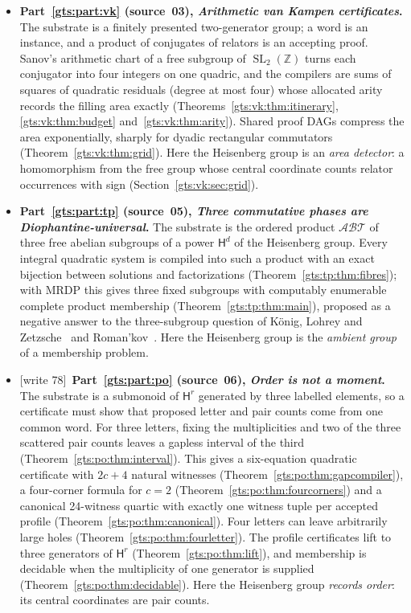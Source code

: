 \documentclass[11pt,letterpaper]{article}
\theoremstyle{definition}
\theoremstyle{remark}
\newcommand{\Z}{\mathbb Z}
\newcommand{\SL}{\operatorname{SL}}
\newcommand{\HH}{\mathsf H}
\newcommand{\calA}{\mathcal A}
\newcommand{\calB}{\mathcal B}
\newcommand{\calT}{\mathcal T}
\newcommand{\wtagb}{\textup{[write 78]}}
\begin{document}
\begin{itemize}
\item \textbf{Part~\ref{gts:part:vk} (source~03), \emph{Arithmetic van Kampen certificates}.} The substrate is a finitely presented two-generator group; a word is an instance, and a product of conjugates of relators is an accepting proof. Sanov's arithmetic chart of a free subgroup of $\SL_2(\Z)$ turns each conjugator into four integers on one quadric, and the compilers are sums of squares of quadratic residuals (degree at most four) whose allocated arity records the filling area exactly (Theorems~\ref{gts:vk:thm:itinerary}, \ref{gts:vk:thm:budget} and~\ref{gts:vk:thm:arity}). Shared proof DAGs compress the area exponentially, sharply for dyadic rectangular commutators (Theorem~\ref{gts:vk:thm:grid}). Here the Heisenberg group is an \emph{area detector}: a homomorphism from the free group whose central coordinate counts relator occurrences with sign (Section~\ref{gts:vk:sec:grid}).
\item \textbf{Part~\ref{gts:part:tp} (source~05), \emph{Three commutative phases are Diophantine-universal}.} The substrate is the ordered product $\calA\calB\calT$ of three free abelian subgroups of a power $\HH^d$ of the Heisenberg group. Every integral quadratic system is compiled into such a product with an exact bijection between solutions and factorizations (Theorem~\ref{gts:tp:thm:fibres}); with MRDP this gives three fixed subgroups with computably enumerable complete product membership (Theorem~\ref{gts:tp:thm:main}), proposed as a negative answer to the three-subgroup question of K\"onig, Lohrey and Zetzsche~\cite{KLZ} and Roman'kov~\cite{Romankov}. Here the Heisenberg group is the \emph{ambient group} of a membership problem.
\item \wtagb\ \textbf{Part~\ref{gts:part:po} (source~06), \emph{Order is not a moment}.} The substrate is a submonoid of $\HH^r$ generated by three labelled elements, so a certificate must show that proposed letter and pair counts come from one common word. For three letters, fixing the multiplicities and two of the three scattered pair counts leaves a gapless interval of the third (Theorem~\ref{gts:po:thm:interval}). This gives a six-equation quadratic certificate with $2c+4$ natural witnesses (Theorem~\ref{gts:po:thm:gapcompiler}), a four-corner formula for $c=2$ (Theorem~\ref{gts:po:thm:fourcorners}) and a canonical 24-witness quartic with exactly one witness tuple per accepted profile (Theorem~\ref{gts:po:thm:canonical}). Four letters can leave arbitrarily large holes (Theorem~\ref{gts:po:thm:fourletter}). The profile certificates lift to three generators of $\HH^r$ (Theorem~\ref{gts:po:thm:lift}), and membership is decidable when the multiplicity of one generator is supplied (Theorem~\ref{gts:po:thm:decidable}). Here the Heisenberg group \emph{records order}: its central coordinates are pair counts.

\end{itemize}
\end{document}
